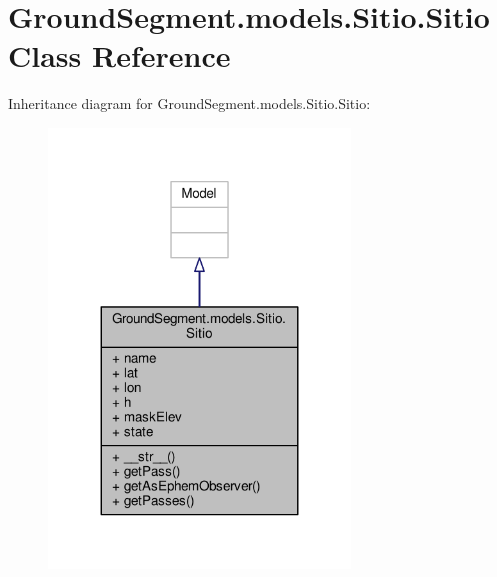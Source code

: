 \hypertarget{class_ground_segment_1_1models_1_1_sitio_1_1_sitio}{}\section{Ground\+Segment.\+models.\+Sitio.\+Sitio Class Reference}
\label{class_ground_segment_1_1models_1_1_sitio_1_1_sitio}


Inheritance diagram for Ground\+Segment.\+models.\+Sitio.\+Sitio\+:\nopagebreak
\begin{figure}[H]
\begin{center}
\leavevmode
\includegraphics[width=227pt]{class_ground_segment_1_1models_1_1_sitio_1_1_sitio__inherit__graph}
\end{center}
\end{figure}


